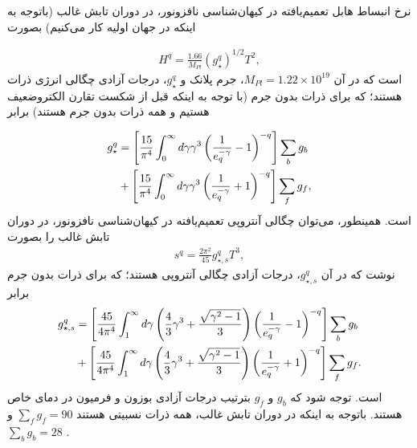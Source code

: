 \documentclass[a4paper]{book}
\begin{document}
نرخ انبساط هابل تعمیم‌یافته در کیهان‌شناسی نافزونور، در دوران تابش غالب (باتوجه به اینکه در جهان اولیه کار می‌کنیم) بصورت \cite{Pessah:2001mz}
\par
\vspace{-0.5cm}
{\footnotesize\begin{align}
	H^q = \frac{1.66}{M_{Pl}} (g_{\star}^q)^{1/2} T^2,
	\label{eq:Hubble-nonextensive}
\end{align}}
است که در آن {\footnotesize$M_{Pl} = 1.22 \times 10^{19}$}، جرم پلانک و {\footnotesize$g_{\star}^q$}، درجات آزادی چگالی انرژی ذرات هستند؛ که برای ذرات بدون جرم (با توجه به اینکه قبل از شکست تقارن الکتروضعیف هستیم و همه ذرات بدون جرم هستند) برابر \cite{Rueter:2019ubf}
\par
\vspace{-0.5cm}
{\footnotesize\begin{align}
	g_{\star}^q &= \left[ \frac{15}{\pi^4} \int_0^{\infty} d\gamma \gamma^3 \left(\frac{1}{e_q^{-\gamma}}-1\right)^{-q} \right] \sum_b g_b \notag \\
	&+ \left[ \frac{15}{\pi^4}\int_0^{\infty} d\gamma \gamma^3 \left(\frac{1}{e_q^{-\gamma}}+1\right)^{-q} \right] \sum_f g_f,
\end{align}}
است. همینطور، می‌توان چگالی آنتروپی تعمیم‌یافته در کیهان‌شناسی نافزونور، در دوران تابش غالب را بصورت \cite{Pessah:2001mz}
{\footnotesize\begin{align}
	s^q = \frac{2 \pi^2}{45} g_{\star, s}^q T^3,
	\label{eq:entropy-nonextensive}
\end{align}}
نوشت که در آن {\footnotesize$g_{\star, s}^q$}، درجات آزادی چگالی آنتروپی هستند؛ که برای ذرات بدون جرم برابر \cite{Rueter:2019ubf}
{\footnotesize\begin{align}
	g_{\star, s}^q &= \left[ \frac{45}{4 \pi^4} \int_1^{\infty} d\gamma \left(\frac{4}{3}\gamma^3+\frac{\sqrt{\gamma^2-1}}{3} \right) \left(\frac{1}{e_q^{-\gamma}}-1\right)^{-q} \right] \sum_b g_b \notag\\
	&+\left[ \frac{45}{4 \pi^4} \int_1^{\infty} d\gamma \left(\frac{4}{3}\gamma^3+\frac{\sqrt{\gamma^2-1}}{3} \right) \left(\frac{1}{e_q^{-\gamma}}+1\right)^{-q} \right] \sum_f g_f.
\end{align}}
است. توجه شود که {\footnotesize$g_b$} و {\footnotesize$g_f$} بترتیب درجات آزادی بوزون و فرمیون در دمای خاص هستند. باتوجه به اینکه در دوران تابش غالب، همه ذرات نسبیتی هستند {\footnotesize$\sum_{f} g_f = 90$} و {\footnotesize$\sum_{b} g_b = 28$} \cite{Husdal:2016haj}.
\end{document}
